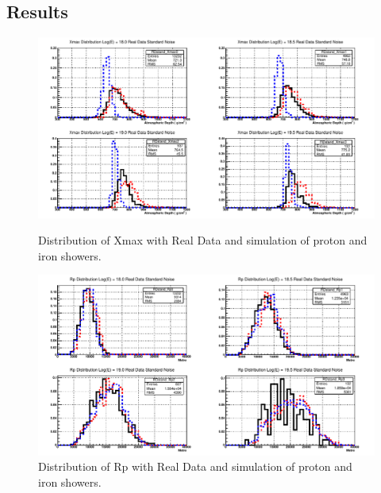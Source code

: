 \subsection{Results}
\begin{figure}
\centering
\includegraphics[width=\textwidth]{chapters/graphs/SelectionEff/RealDataAndSim_XmaxDistComp.pdf}
\caption{Distribution of Xmax with Real Data and simulation of proton and iron showers.}
\vspace{3mm}
\includegraphics[width=\textwidth]{chapters/graphs/SelectionEff/RealDataAndSim_RpDistComp.pdf}
\caption{Distribution of Rp with Real Data and simulation of proton and iron showers.}
\end{figure}

